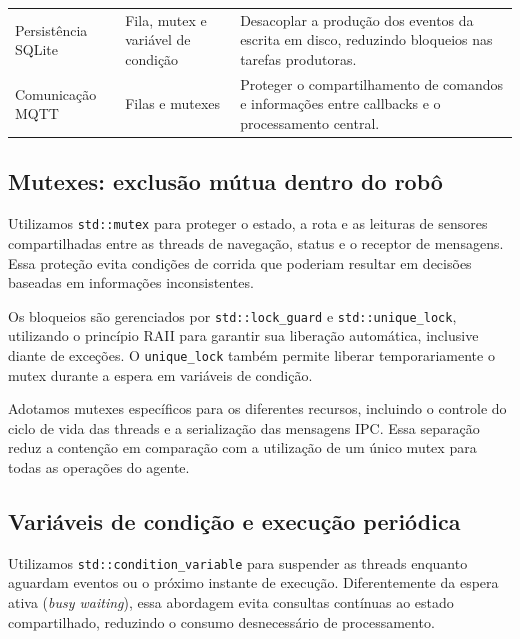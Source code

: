 \documentclass[12pt,a4paper]{article}
\newcommand{\code}[1]{\mbox{\texttt{#1}}}
\begin{document}
\begin{table}[H]
\begin{tabularx}{\textwidth}{@{}p{2.8cm}p{3.0cm}Y@{}}
        Persistência SQLite       & Fila, mutex e variável de condição                & Desacoplar a
        produção dos eventos da escrita em disco, reduzindo bloqueios nas tarefas
        produtoras.                                                                                                               \\

        Comunicação MQTT          & Filas e mutexes                                   & Proteger o compartilhamento de comandos e
        informações entre callbacks e o processamento central.                                                                    \\

        \bottomrule
    \end{tabularx}

    \endgroup
\end{table}

\subsection{Mutexes: exclusão mútua dentro do robô}

Utilizamos \code{std::mutex} para proteger o estado, a rota e as leituras de
sensores compartilhadas entre as threads de navegação, status e o receptor de
mensagens. Essa proteção evita condições de corrida que poderiam resultar em
decisões baseadas em informações inconsistentes.

Os bloqueios são gerenciados por \code{std::lock\_guard} e
\code{std::unique\_lock}, utilizando o princípio RAII para garantir sua
liberação automática, inclusive diante de exceções. O \code{unique\_lock}
também permite liberar temporariamente o mutex durante a espera em variáveis de
condição.

Adotamos mutexes específicos para os diferentes recursos, incluindo o controle
do ciclo de vida das threads e a serialização das mensagens IPC. Essa separação
reduz a contenção em comparação com a utilização de um único mutex para todas
as operações do agente.

\subsection{Variáveis de condição e execução periódica}

Utilizamos \code{std::condition\_variable} para suspender as threads enquanto
aguardam eventos ou o próximo instante de execução. Diferentemente da espera
ativa (\textit{busy waiting}), essa abordagem evita consultas contínuas ao
estado compartilhado, reduzindo o consumo desnecessário de processamento.
\end{document}
